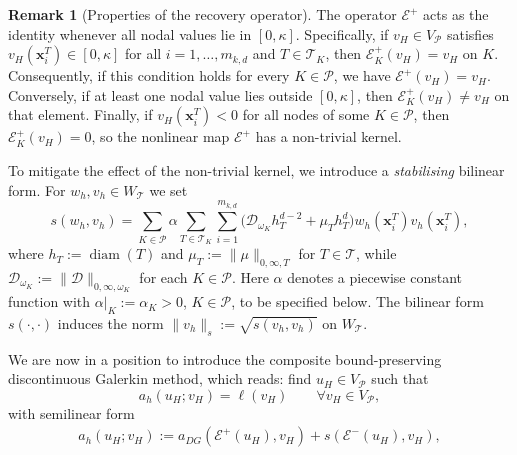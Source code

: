 \documentclass[11pt,final]{amsart}
\theoremstyle{plain}
\theoremstyle{definition}
\newtheorem{Remark}[theorem]{Remark}
\newcommand\bx{\boldsymbol{x}}
\newcommand\calP{{\mathcal{P}}}
\newcommand\calT{{\mathcal{T}}}
\newcommand{\mesh}{\calP}
\newcommand{\diam}{\operatorname{diam}}
\begin{document}
\begin{Remark}[Properties of the recovery operator]
The operator $\mathcal{E}^+$ acts as the identity whenever all nodal
values lie in $[0,\kappa]$. Specifically, if $v_H\in V_\calP$ satisfies
$v_H(\bx_i^T)\in[0,\kappa]$ for all $i=1,\ldots,m_{k,d}$ and
$T\in\calT_K$, then $\mathcal{E}_{K}^+(v_H)=v_H$ on $K$. Consequently,
if this condition holds for every $K\in\calP$, we have
$\mathcal{E}^+(v_H)=v_H$. Conversely, if at least one nodal value lies
outside $[0,\kappa]$, then $\mathcal{E}_{K}^+(v_H)\neq v_H$ on that
element. Finally, if $v_H(\bx_i^T)<0$ for all nodes of some
$K\in\calP$, then $\mathcal{E}_{K}^+(v_H)=0$, so the nonlinear map
$\mathcal{E}^+$ has a non-trivial kernel.
\end{Remark}

To mitigate the effect of the non-trivial kernel, we introduce a
\emph{stabilising} bilinear form. For $w_h,v_h\in W_{\calT}$ we set
\begin{equation}
  s(w_h,v_h)=\sum_{K\in\mesh}\alpha\sum_{T\in\calT_K}\sum_{i=1}^{m_{k,d}}
  \big(\mathcal{D}_{\omega_K} h_T^{d-2}+\mu_T h_T^{d} \big)
  w_h(\bx_i^T)v_h(\bx_i^T) ,\label{eq20}
\end{equation}
where $h_T:=\diam(T)$ and $\mu_T:=\|\mu\|_{0,\infty,T}$ for
$T\in\calT$, while
$\mathcal{D}_{\omega_K}:=\|\mathcal{D}\|_{0,\infty,\omega_K}$ for each
$K\in\calP$. Here $\alpha$ denotes a piecewise constant function with
$\alpha|_K:=\alpha_K>0$, $K\in\mesh$, to be specified below. The
bilinear form $s(\cdot,\cdot)$ induces the norm
$\|v_h\|_{s}:=\sqrt{s(v_h,v_h)}$ on $W_\calT$.

We are now in a position to introduce the composite
bound-preserving discontinuous Galerkin method, which reads: find
$u_H\in V_\calP$ such that
\begin{equation}
  a_{h}(u_{H};v_{H})=\ell(v_{H})
  \qquad \forall v_{H}\in V_\calP,\label{BP-DG}
\end{equation}
with semilinear form
\begin{align}
  a_{h}(u_{H};v_{H})
  :=a_{DG}(\mathcal{E}^{+}(u_{H}),v_{H})
    +s(\mathcal{E}^{-}(u_{H}),v_{H}) ,\label{FEMethod}
\end{align}
\end{document}
